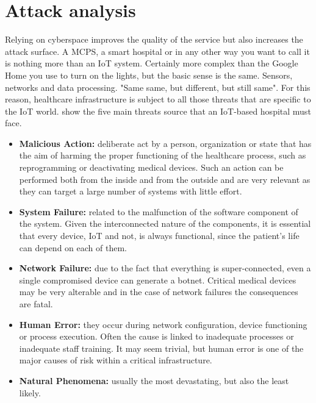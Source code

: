 \section{Attack analysis}
Relying on cyberspace improves the quality of the service but also increases the attack surface. A MCPS, a smart hospital or in any other way you want to call it is nothing more than an IoT system. Certainly more complex than the Google Home you use to turn on the lights, but the basic sense is the same. Sensors, networks and data processing. "Same same, but different, but still same". For this reason, healthcare infrastructure is subject to all those threats that are specific to the IoT world. \cite{Djenna2018} show the five main threats source that an IoT-based hospital must face.
\begin{itemize}
    \item \textbf{Malicious Action:} deliberate act by a person, organization or state that has the aim of harming the proper functioning of the healthcare process, such as reprogramming or deactivating medical devices. Such an action can be performed both from the inside and from the outside and are very relevant as they can target a large number of systems with little effort.
    \item \textbf{System Failure:} related to the malfunction of the software component of the system. Given the interconnected nature of the components, it is essential that every device, IoT and not, is always functional, since the patient's life can depend on each of them.
    \item \textbf{Network Failure:} due to the fact that everything is super-connected, even a single compromised device can generate a botnet. Critical medical devices may be very alterable and in the case of network failures the consequences are fatal.
    \item \textbf{Human Error:} they occur during network configuration, device functioning or process execution. Often the cause is linked to inadequate processes or inadequate staff training. It may seem trivial, but human error is one of the major causes of risk within a critical infrastructure.
    \item \textbf{Natural Phenomena:} usually the most devastating, but also the least likely.
\end{itemize}
